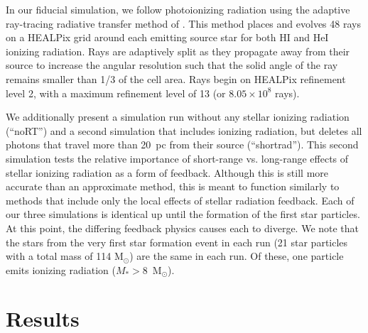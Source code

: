 \documentclass[twocolumn]{aastex62}
\begin{document}
In our fiducial simulation, we follow photoionizing radiation using the adaptive ray-tracing radiative transfer method of \cite{WiseAbel2011}. This method places and evolves 48 rays on a HEALPix grid around each emitting source star for both HI and HeI ionizing radiation. Rays are adaptively split as they propagate away from their source to increase the angular resolution such that the solid angle of the ray remains smaller than 1/3 of the cell area. Rays begin on HEALPix refinement level 2, with a maximum refinement level of 13 (or $8.05 \times 10^8$ rays).

We additionally present a simulation run without any stellar ionizing radiation (``noRT'') and a second simulation that includes ionizing radiation, but deletes all photons that travel more than 20~pc from their source (``shortrad''). This second simulation tests the relative importance of short-range vs. long-range effects of stellar ionizing radiation as a form of feedback. Although this is still more accurate than an approximate method, this is meant to function similarly to methods that include only the local effects of stellar radiation feedback. Each of our three simulations is identical up until the formation of the first star particles. At this point, the differing feedback physics causes each to diverge. We note that the stars from the very first star formation event in each run (21 star particles with a total mass of 114 M$_{\odot}$) are the same in each run. Of these, one particle emits ionizing radiation ($M_* > 8 $~M$_{\odot}$). 

\section{Results} \label{sec:results}
\end{document}
